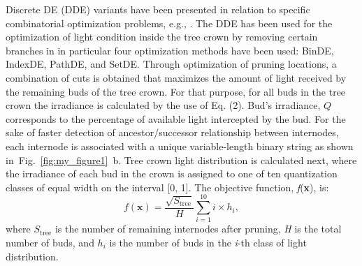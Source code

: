 Discrete DE (DDE) variants have been presented in relation to specific
combinatorial optimization problems, e.g., \cite{davendra_flow_2009,pan_discrete_2008,wang_novel_2010}. The DDE has
been used for the optimization of light condition inside the tree crown
by removing certain branches in \cite{strnad_novel_2017} in particular four optimization
methods have been used: BinDE, IndexDE, PathDE, and SetDE. Through
optimization of pruning locations, a combination of cuts is obtained
that maximizes the amount of light received by the remaining buds of the
tree crown. For that purpose, for all buds in the tree crown the
irradiance is calculated by the use of Eq. (2). Bud's irradiance, \(Q\)
corresponds to the percentage of available light intercepted by the bud.
For the sake of faster detection of ancestor/successor relationship
between internodes, each internode is associated with a unique
variable-length binary string as shown in~Fig.~\ref{fig:my_figure1}~b. Tree crown light
distribution is calculated next, where the irradiance of each bud in the
crown is assigned to one of ten quantization classes of equal width on
the interval {[}0, 1{]}. The objective function, \emph{f}(\textbf{x}),
is:
\begin{equation}
 f\left( \mathbf{x} \right) = \frac{\sqrt{S_{\mathrm{\text{tree}}}}}{H}\sum_{i = 1}^{10}{i \times h_{i}}, 
\end{equation}
where \(S_{\mathrm{\text{tree}}}\) is the number of remaining internodes
after pruning, \emph{H} is the total number of buds, and \(h_{i}\) is
the number of buds in the \emph{i}-th class of light distribution.

